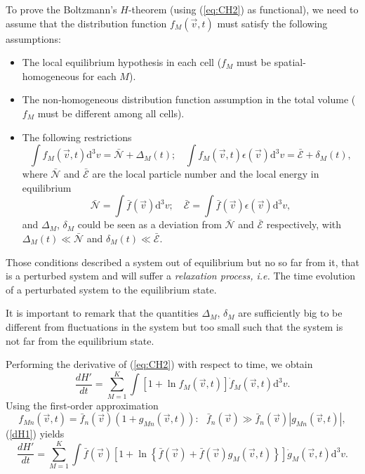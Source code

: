To prove the Boltzmann's $H$-theorem (using (\ref{eq:CH2}) as functional), we need
to assume that the distribution function $f_M(\vec{v},t)$ must satisfy the
following assumptions:
%
\begin{itemize}
  \item The local equilibrium hypothesis in each cell ($f_{M}$ must be
    spatial-homogeneous for each $M$).
  \item The non-homogeneous distribution function assumption in the total
    volume ($f_{M}$ must be different among all cells).
  \item The following restrictions
    \begin{equation}\label{restrictionoutsideclassical}
      \int f_{M}(\vec{v},t) \mathrm{d}^{3}v=
      \bar{\mathcal{N}}+\Delta_M(t); \ \ \ \ 
      \int f_{M}(\vec{v},t) \epsilon(\vec{v}) \mathrm{d}^{3}v=
      \bar{\mathcal{E}}+ \delta_M(t),
    \end{equation}
    where $\bar {\mathcal{N}}$ and $\bar{\mathcal{E}}$ are
    the local particle number and the local energy in equilibrium
    \begin{equation}
      \bar{\mathcal{N}}=
      \int \bar{f}(\vec{v}) \mathrm{d}^{3}v ; \quad
      \bar{\mathcal{E}}=
      \int \bar{f}(\vec{v})\epsilon(\vec{v}) \mathrm{d}^{3}v,
    \end{equation}
    and $\Delta_M$, $\delta_M$ could be seen as a deviation from
    $\bar{\mathcal{N}}$ and $\bar{\mathcal{E}}$ respectively,
    with $\Delta_M(t)\ll\bar{\mathcal{N}}$ and
    $\delta_M(t)\ll\bar{\mathcal{E}}$.
\end{itemize} 
%
Those conditions described a system out of equilibrium but no so far from it,
that is a perturbed system and will suffer a \textit{relaxation process, i.e.}
The time evolution of a perturbated system to the equilibrium state.

It is important to remark that the quantities $\Delta_M$, $\delta_M$ are
sufficiently big to be different from fluctuations in the system but too small
such that the system is not far from the equilibrium state.  

Performing the derivative of (\ref{eq:CH2}) with respect to time, we obtain
%
\begin{equation}\label{dH1}
    \frac{dH'}{dt}=\sum_{M=1}^{K}\int\left[
      1+\ln f_M(\vec{v},t)
    \right]\dot f_M(\vec{v},t)\mathrm{d}^3v.
\end{equation}
%
Using the first-order approximation
%
\begin{equation}\label{firstorder}
   f_{Mn}(\vec{v},t)=\bar{f}_{n}(\vec{v})(1+g_{Mn}(\vec{v},t)): \ \ \ 
   \bar{f}_{n}(\vec{v})\gg \bar{f}_{n}(\vec{v})|g_{Mn}(\vec{v},t)|,
\end{equation}
%
(\ref{dH1}) yields
%
\begin{equation}\label{dH1-1}
    \frac{dH'}{dt}=\sum_{M=1}^{K}\int\bar f(\vec{v}) \left[
      1+\ln \left\{
        \bar f(\vec{v})+\bar f(\vec{v})g_M(\vec{v},t)
      \right\}
    \right]\dot g_M(\vec{v},t)\mathrm{d}^3v.
\end{equation}
%

